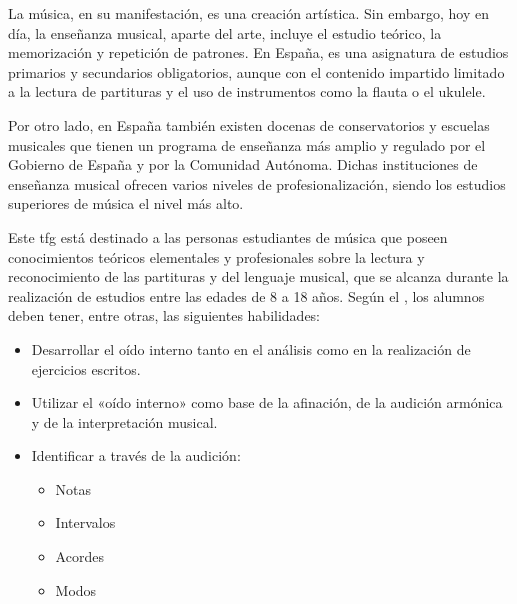 La música, en su manifestación, es una creación artística. Sin embargo, hoy en día, la enseñanza musical, aparte del arte, incluye el estudio teórico, la memorización y repetición de patrones. En España, es una asignatura de estudios primarios y secundarios obligatorios, aunque con el contenido impartido limitado a la lectura de partituras y el uso de instrumentos como la flauta o el ukulele.
\par Por otro lado, en España también existen docenas de conservatorios y escuelas musicales que tienen un programa de enseñanza más amplio y regulado por el Gobierno de España y por la Comunidad Autónoma. Dichas instituciones de enseñanza musical ofrecen varios niveles de profesionalización, siendo los estudios superiores de música el nivel más alto.
\par Este \gls{tfg} está destinado a las personas estudiantes de música que poseen conocimientos teóricos elementales y profesionales sobre la lectura y reconocimiento de las partituras y del lenguaje musical, que se alcanza durante la realización de estudios entre las edades de 8 a 18 años. Según el \citet{rd-1577-2006}, los alumnos deben tener, entre otras, las siguientes habilidades:
\begin{itemize}
	\item Desarrollar el oído interno tanto en el análisis como en la realización de ejercicios escritos.
	\item Utilizar el «oído interno» como base de la afinación, de la audición armónica y de la interpretación musical.
	\item Identificar a través de la audición:
	\begin{itemize}
		\item Notas
		\item Intervalos
		\item Acordes
		\item Modos
	\end{itemize}
\end{itemize}

